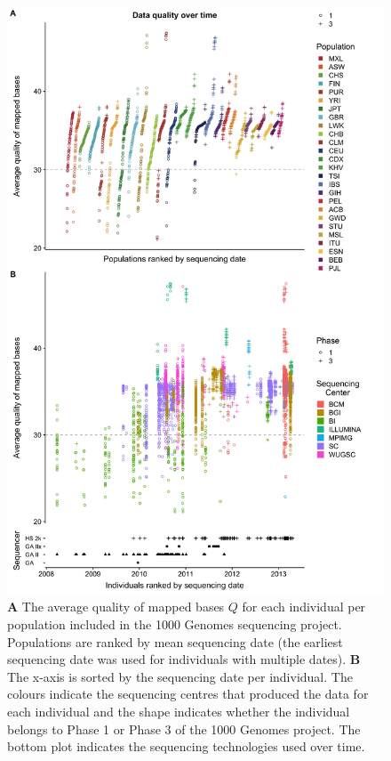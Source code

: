 \documentclass[9pt,lineno]{template}
\begin{document}
\begin{figure}
\includegraphics[width=0.95\hsize,keepaspectratio]{../Figures/MapQualOverTime.jpg}

\caption{\textbf{A} The average quality of mapped bases $Q$ for each individual per population included in the 1000 Genomes sequencing project. 
 Populations are ranked by mean sequencing date (the earliest sequencing date was used for individuals with multiple dates). 
 \textbf{B} The x-axis is sorted by the sequencing date per individual. 
The colours indicate the sequencing centres that produced the data for each individual and the shape indicates whether the individual belongs to Phase 1 or Phase 3 of the 1000 Genomes project. 
The bottom plot indicates the sequencing technologies used over time.}
\label{MapQual}
\end{figure}
\end{document}
